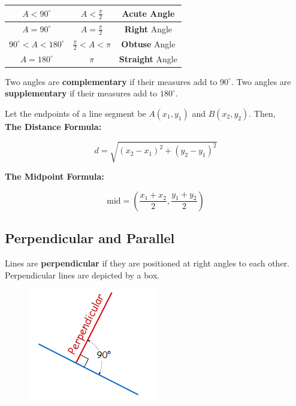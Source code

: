\documentclass{article}
\begin{document}
            \begin{center}
                \begin{tabular}{|c|c|c|}
                    \hline
                    $A<90^\circ$ & $A<\frac{\pi}{2}$ & \textbf{Acute} Angle \\
                    \hline
                    $A=90^\circ$ & $A=\frac{\pi}{2}$ & \textbf{Right} Angle \\
                    \hline
                    $90^\circ < A < 180^\circ$ & $\frac{\pi}{2} < A < \pi$ &\textbf{Obtuse} Angle \\
                    \hline
                    $A=180^\circ$ & $\pi$ & \textbf{Straight} Angle \\
                    \hline
                \end{tabular}
            \end{center}

            \noindent Two angles are \textbf{complementary} if their measures add to $90^\circ$.
            Two angles are \textbf{supplementary} if their measures add to $180^\circ$.

            \noindent Let the endpoints of a line segment be $A(x_1, y_1)$ and $B(x_2, y_2)$. Then, \\

            \noindent \color{purple} \textbf{The Distance Formula:} \color{black}

            \begin{equation*}
                d=\sqrt{(x_2-x_1)^2+(y_2-y_1)^2}
            \end{equation*}

            \noindent \color{purple} \textbf{The Midpoint Formula:} \color{black}

            \begin{equation*}
                \text{mid}=\left(\frac{x_1+x_2}{2},\frac{y_1+y_2}{2}\right)
            \end{equation*}

        \subsection{Perpendicular and Parallel}
            Lines are \textbf{perpendicular} if they are positioned at right angles to each other.
            Perpendicular lines are depicted by a box. \\

            \begin{figure} [hbt!]
                \centering
                \includegraphics[scale = 0.6] {Resources/Unit1Basics/perpendicular.PNG}
            \end{figure}
\end{document}
